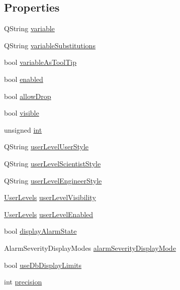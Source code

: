\subsection*{Properties}
\begin{DoxyCompactItemize}
\item 
QString \hyperlink{classQEAnalogProgressBar_ac9cb8f86c0abbbd9836ea91c14b483e4}{variable}
\item 
QString \hyperlink{classQEAnalogProgressBar_afc7fe5bd7881f0a998cef3d33e056182}{variableSubstitutions}
\item 
bool \hyperlink{classQEAnalogProgressBar_adebc19a6d57ab0712c78663b060f0b95}{variableAsToolTip}
\item 
bool \hyperlink{classQEAnalogProgressBar_a0bfadd6048cf4d39c16110536b0d80cc}{enabled}
\item 
bool \hyperlink{classQEAnalogProgressBar_a647882bfa81bbde45d2c2be4b1d691d6}{allowDrop}
\item 
bool \hyperlink{classQEAnalogProgressBar_a814a89e7944258acf7dae8f05ae43554}{visible}
\item 
unsigned \hyperlink{classQEAnalogProgressBar_abf621cec891bfd1682706c1d69b230d3}{int}
\item 
QString \hyperlink{classQEAnalogProgressBar_af1076f7c81d12f8138e63f1e9fd6acde}{userLevelUserStyle}
\item 
QString \hyperlink{classQEAnalogProgressBar_a2df6688a176e6c3617cc8b23e2b93c8a}{userLevelScientistStyle}
\item 
QString \hyperlink{classQEAnalogProgressBar_a0f74beab0aaf83d08cef24458a80ef72}{userLevelEngineerStyle}
\item 
\hyperlink{classQEAnalogProgressBar_a5afb1b38e0d5ffd01e4ce13e621aaee2}{UserLevels} \hyperlink{classQEAnalogProgressBar_a0cbd8e0e0efd615267693c4454919808}{userLevelVisibility}
\item 
\hyperlink{classQEAnalogProgressBar_a5afb1b38e0d5ffd01e4ce13e621aaee2}{UserLevels} \hyperlink{classQEAnalogProgressBar_a7a7b55bb1e88670eeda1d8f759f18c0a}{userLevelEnabled}
\item 
bool \hyperlink{classQEAnalogProgressBar_a251e3abc3ab482f04e085e693c5ff5e8}{displayAlarmState}
\item 
AlarmSeverityDisplayModes \hyperlink{classQEAnalogProgressBar_a56a25b5a3d02ee737837b8e4bc15cd8f}{alarmSeverityDisplayMode}
\item 
bool \hyperlink{classQEAnalogProgressBar_a5ce12a78667eafebc8c9d7f9924acbf7}{useDbDisplayLimits}
\item 
int \hyperlink{classQEAnalogProgressBar_a6e6f5d1f444a353fd7425d831d27069d}{precision}

\end{DoxyCompactItemize}
